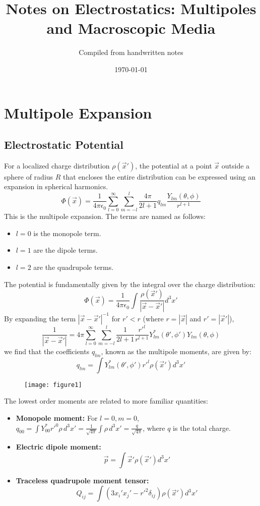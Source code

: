 \documentclass{article}
\title{Notes on Electrostatics: Multipoles and Macroscopic Media}
\author{Compiled from handwritten notes}
\date{\today}
\begin{document}
	\maketitle
	
	\section{Multipole Expansion}
	
	\subsection{Electrostatic Potential}
	For a localized charge distribution $\rho(\vec{x}')$, the potential at a point $\vec{x}$ outside a sphere of radius $R$ that encloses the entire distribution can be expressed using an expansion in spherical harmonics.
	\[
	\Phi(\vec{x}) = \frac{1}{4\pi\epsilon_0} \sum_{l=0}^{\infty} \sum_{m=-l}^{l} \frac{4\pi}{2l+1} q_{lm} \frac{Y_{lm}(\theta, \phi)}{r^{l+1}}
	\]
	This is the multipole expansion. The terms are named as follows:
	\begin{itemize}
		\item $l=0$ is the monopole term.
		\item $l=1$ are the dipole terms.
		\item $l=2$ are the quadrupole terms.
	\end{itemize}
	
	The potential is fundamentally given by the integral over the charge distribution:
	\[
	\Phi(\vec{x}) = \frac{1}{4\pi\epsilon_0} \int \frac{\rho(\vec{x}')}{|\vec{x} - \vec{x}'|} d^3x'
	\]
	By expanding the term $|\vec{x} - \vec{x}'|^{-1}$ for $r' < r$ (where $r = |\vec{x}|$ and $r' = |\vec{x}'|$),
	\[
	\frac{1}{|\vec{x} - \vec{x}'|} = 4\pi \sum_{l=0}^{\infty} \sum_{m=-l}^{l} \frac{1}{2l+1} \frac{r'^l}{r^{l+1}} Y_{lm}^*(\theta', \phi') Y_{lm}(\theta, \phi)
	\]
	we find that the coefficients $q_{lm}$, known as the multipole moments, are given by:
	\[
	q_{lm} = \int Y_{lm}^*(\theta', \phi') r'^l \rho(\vec{x}') d^3x'
	\]
	
	\begin{figure}[h]
		\centering
		\texttt{[image: figure1]}
		\caption{}
		\label{fig:figure1}
	\end{figure}
	
	The lowest order moments are related to more familiar quantities:
	\begin{itemize}
		\item \textbf{Monopole moment:} For $l=0, m=0$, $q_{00} = \int Y_{00}^* r'^0 \rho \,d^3x' = \frac{1}{\sqrt{4\pi}} \int \rho \,d^3x' = \frac{q}{\sqrt{4\pi}}$, where $q$ is the total charge.
		\item \textbf{Electric dipole moment:}
		\[
		\vec{p} = \int \vec{x}' \rho(\vec{x}') d^3x'
		\]
		\item \textbf{Traceless quadrupole moment tensor:}
		\[
		Q_{ij} = \int (3x_i' x_j' - r'^2 \delta_{ij}) \rho(\vec{x}') d^3x'
		\]
	\end{itemize}
	
\end{document}
